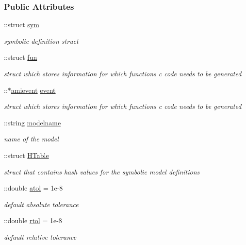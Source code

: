 \subsubsection*{Public Attributes}
\begin{DoxyCompactItemize}
\item 
\+::struct \hyperlink{classamimodel_a3c48fff3d28406486a4f1b5e18da7ca6}{sym}
\begin{DoxyCompactList}\small\item\em symbolic definition struct \end{DoxyCompactList}\item 
\+::struct \hyperlink{classamimodel_a743fa290dbc0a67a3843d5ab0426e9b4}{fun}
\begin{DoxyCompactList}\small\item\em struct which stores information for which functions c code needs to be generated \end{DoxyCompactList}\item 
\+::$\ast$\hyperlink{classamievent}{amievent} \hyperlink{classamimodel_a3b65133bb9997cd1ccf311af0927fc9e}{event}
\begin{DoxyCompactList}\small\item\em struct which stores information for which functions c code needs to be generated \end{DoxyCompactList}\item 
\+::string \hyperlink{classamimodel_a71bca9c21a6de42d8079ade31cb61044}{modelname}
\begin{DoxyCompactList}\small\item\em name of the model \end{DoxyCompactList}\item 
\+::struct \hyperlink{classamimodel_aafe6335df413dd688a2f44efba012cf1}{H\+Table}
\begin{DoxyCompactList}\small\item\em struct that contains hash values for the symbolic model definitions \end{DoxyCompactList}\item 
\+::double \hyperlink{classamimodel_a0c5f3dcf809a17b895fe12fc91272349}{atol} = 1e-\/8
\begin{DoxyCompactList}\small\item\em default absolute tolerance \end{DoxyCompactList}\item 
\+::double \hyperlink{classamimodel_a7978e9a4674f869e6b2950e2f6262ca5}{rtol} = 1e-\/8
\begin{DoxyCompactList}\small\item\em default relative tolerance \end{DoxyCompactList}\item 

\end{DoxyCompactItemize}
